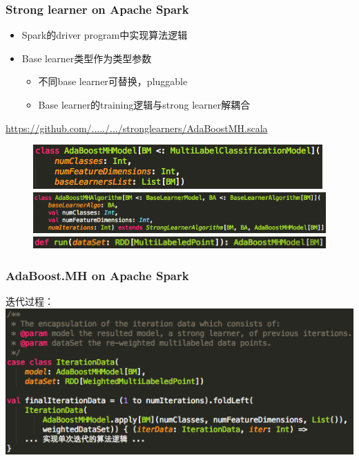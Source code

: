 \documentclass{beamer}
\begin{document}
\begin{frame}
\frametitle{Strong learner on Apache Spark}
\begin{itemize}
\item Spark的driver program中实现算法逻辑
\item Base learner类型作为类型参数
  \begin{itemize}
    \item 不同base learner可替换，pluggable
    \item Base learner的training逻辑与strong learner解耦合
  \end{itemize}
\end{itemize}
{ \footnotesize
\href{https://github.com/BaiGang/spark_multiboost/blob/master/src/main/scala/org/apache/spark/mllib/classification/multilabel/stronglearners/AdaBoostMH.scala}{https://github.com/...../.../stronglearners/AdaBoostMH.scala}
}
\begin{figure}
\includegraphics[scale=0.5,left]{img/adbm_model_spark.png} \\
\includegraphics[scale=0.5,left]{img/adbm_algo_spark.png} \\
\includegraphics[scale=0.5,left]{img/adbm_run.png}
\end{figure}
\end{frame}

\begin{frame}
\frametitle{AdaBoost.MH on Apache Spark}
迭代过程：
\includegraphics[scale=0.5,left]{img/iteration.png}
\end{frame}
\end{document}
